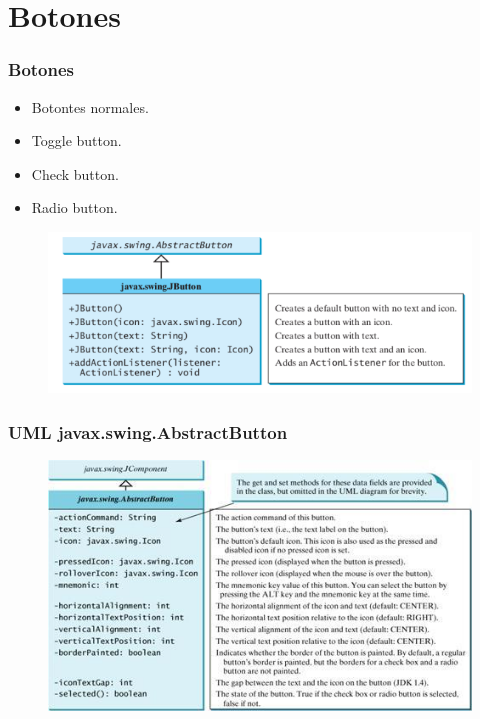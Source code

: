 \documentclass{beamer}
\begin{document}
\section{Botones}
\begin{frame}
\frametitle{Botones}
\begin{itemize}[<+->]
\item Botontes normales.
\item Toggle button.
\item Check button.
\item Radio button.
\end{itemize}
\pause
\begin{figure}
\includegraphics[scale=0.6]{imagenes/botones.png}
\end{figure}
\end{frame}


\begin{frame}[fragile]
\frametitle{UML javax.swing.AbstractButton}
\begin{figure}
\includegraphics[width=\textwidth]{imagenes/botones.jpg}
\end{figure}
\end{frame}
\end{document}
